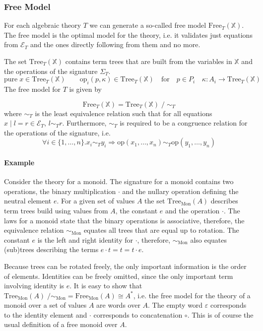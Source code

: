 \subsubsection{Free Model}

For each algebraic theory $T$ we can generate a so-called free model
$\mathrm{Free}_T(\mathbb{X})$.
The free model is the optimal model for the theory, i.e. it validates just
equations from $\mathcal{E}_T$ and the ones directly following from them and no
more.

The set $\mathrm{Tree}_T(\mathbb{X})$ contains term trees that are built from
the variables in $\mathbb{X}$ and the operations of the signature $\Sigma_T$.
\[
  \mathrm{pure}\;x \in \mathrm{Tree}_T(\mathbb{X}) \qquad \mathrm{op}_i(p,\kappa)
  \in \mathrm{Tree}_T(\mathbb{X}) \quad\text{for}\quad p\in P_i \quad \kappa :
  A_i \rightarrow \mathrm{Tree}_T(\mathbb{X})
\]
The free model for $T$ is given by

\[
  \mathrm{Free}_T(\mathbb{X}) = \mathrm{Tree}_T(\mathbb{X})\; /\;\sim_T
\]
where $\sim_T$ is the least equivalence relation such that for all equations
$x\;|\;l=r\in\mathcal{E}_T$, $l\sim_T r$.
Furthermore, $\sim_T$ is required to be a congruence relation for the operations
of the signature, i.e.
\[
  \forall i\in\{1,\dots ,n\}. x_i\sim_T y_i \Rightarrow \mathrm{op}(x_1,\dots , x_n)
  \sim_T \mathrm{op}(y_1,\dots , y_n)
\]

\paragraph{Example}

Consider the theory for a monoid.
The signature for a monoid contains two operations, the binary multiplication $\cdot$
and the nullary operation defining the neutral element $e$.
For a given set of values $A$ the set $\mathrm{Tree}_{\mathrm{Mon}}(A)$ describes term trees
build using values from $A$, the constant $e$ and the operation $\cdot$.
The laws for a monoid state that the binary operations is associative,
therefore, the equivalence relation $\sim_{\mathrm{Mon}}$ equates all trees that
are equal up to rotation.
The constant $e$ is the left and right identity for $\cdot$, therefore,
$\sim_{\mathrm{Mon}}$ also equates (sub)trees describing the terms $e\cdot t = t
= t \cdot e$.

Because trees can be rotated freely, the only important information is the order
of elements.
Identities can be freely omitted, since the only important term involving
identity is $e$.
It is easy to show that $\mathrm{Tree}_{\mathrm{Mon}}(A)
\;/\sim_{\mathrm{Mon}} = \mathrm{Free}_{\mathrm{Mon}}(A) \cong A^*$, i.e. the
free model for the theory of a monoid over a set of values $A$ are words over
$A$.
The empty word $\varepsilon$ corresponds to the identity element and $\cdot$
corresponds to concatenation $\circ$.
This is of course the usual definition of a free monoid over $A$.


